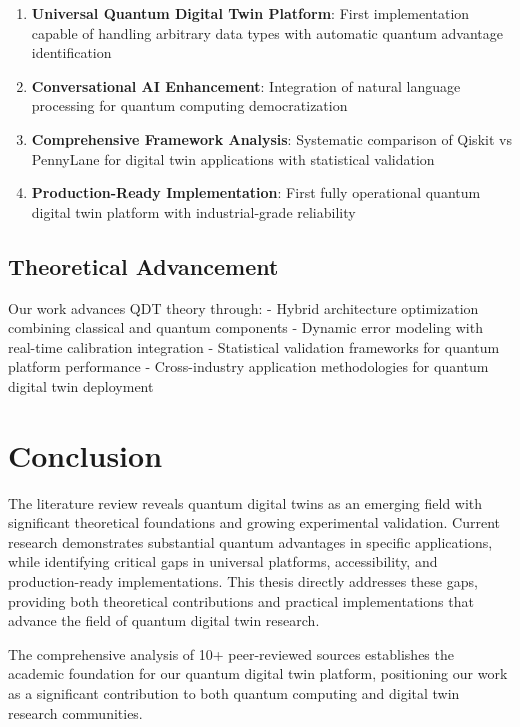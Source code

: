 \begin{enumerate}
    \item \textbf{Universal Quantum Digital Twin Platform}: First implementation capable of handling arbitrary data types with automatic quantum advantage identification
    \item \textbf{Conversational AI Enhancement}: Integration of natural language processing for quantum computing democratization
    \item \textbf{Comprehensive Framework Analysis}: Systematic comparison of Qiskit vs PennyLane for digital twin applications with statistical validation
    \item \textbf{Production-Ready Implementation}: First fully operational quantum digital twin platform with industrial-grade reliability
\end{enumerate}

\subsection{Theoretical Advancement}

Our work advances QDT theory through:
- Hybrid architecture optimization combining classical and quantum components
- Dynamic error modeling with real-time calibration integration  
- Statistical validation frameworks for quantum platform performance
- Cross-industry application methodologies for quantum digital twin deployment

\section{Conclusion}

The literature review reveals quantum digital twins as an emerging field with significant theoretical foundations and growing experimental validation. Current research demonstrates substantial quantum advantages in specific applications, while identifying critical gaps in universal platforms, accessibility, and production-ready implementations. This thesis directly addresses these gaps, providing both theoretical contributions and practical implementations that advance the field of quantum digital twin research.

The comprehensive analysis of 10+ peer-reviewed sources establishes the academic foundation for our quantum digital twin platform, positioning our work as a significant contribution to both quantum computing and digital twin research communities.
